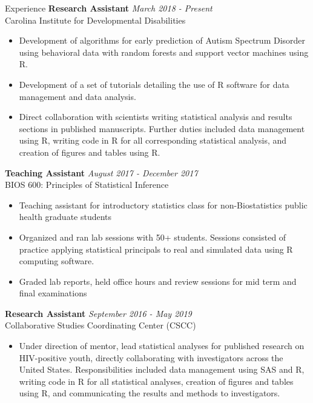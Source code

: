 \documentclass{resume} %
\begin{document}
\begin{rSection}{Experience}
{\bf Research Assistant} \hfill {\em March 2018 - Present}
\\ Carolina Institute for Developmental Disabilities
\begin{itemize}
    \item Development of algorithms for early prediction of Autism Spectrum Disorder using behavioral data with random forests and support vector machines using R.
    \item Development of a set of tutorials detailing the use of R software for data management and data analysis.
    \item Direct collaboration with scientists writing statistical analysis and results sections in published manuscripts.  Further duties included data management using R, writing code in R for all corresponding statistical analysis, and creation of figures and tables using R.
\end{itemize}
{\bf Teaching Assistant} \hfill {\em August 2017 - December 2017} 
\\ BIOS 600: Principles of Statistical Inference
\begin{itemize}
    \item Teaching assistant for introductory statistics class for non-Biostatistics public health graduate students
    \item Organized and ran lab sessions with 50+ students.  Sessions consisted of practice applying statistical principals to real and simulated data using R computing software.
    \item Graded lab reports, held office hours and review sessions for mid term and final examinations
\end{itemize}
{\bf Research Assistant} \hfill {\em September 2016 - May 2019} 
\\ Collaborative Studies Coordinating Center (CSCC)
\begin{itemize}
    \item Under direction of mentor, lead statistical analyses for published research on HIV-positive youth, directly collaborating with investigators across the United States.  Responsibilities included data management using SAS and R, writing code in R for all statistical analyses, creation of figures and tables using R, and communicating the results and methods to investigators.

\end{itemize}
\end{rSection}
\end{document}
